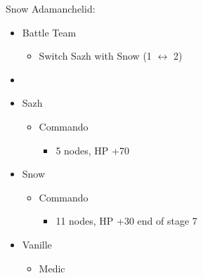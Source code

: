 \begin{multicols}{2}
  \begin{center}
    Snow Adamanchelid:
  \end{center}
  \begin{menu}
    \begin{itemize}
      \paradigm
      \begin{itemize}
        \item Battle Team
              \begin{itemize}
                \item Switch Sazh with Snow (1 $\leftrightarrow$ 2)
              \end{itemize}
        \item {}%
              {\paradigmline{(\rav)}{\com}{\com}}%
              {\paradigmline[2]{\textit{\com}}{\textit{\com}}{\textit{\com}}}%
              {\paradigmline{(\rav)}{\sen}{(\rav)}}%
              {\paradigmline{(\com)}{(\sen)}{\med}}%
              {\paradigmline{\rav}{(\com)}{(\rav)}}%
              {\paradigmline{\rav}{\rav}{\rav}}
      \end{itemize}
      \crystarium
      \begin{itemize}
        \item Sazh
              \begin{itemize}
                \item Commando
                      \begin{itemize}
                        \item 5 nodes, HP +70
                      \end{itemize}
              \end{itemize}
        \item Snow
              \begin{itemize}
                \item Commando
                      \begin{itemize}
                        \item 11 nodes, HP +30 end of stage 7
                      \end{itemize}
              \end{itemize}
        \item Vanille
              \begin{itemize}
                \item Medic
                      \begin{itemize}

\end{itemize}
\end{itemize}
\end{itemize}
\end{itemize}
\end{menu}
\end{multicols}
